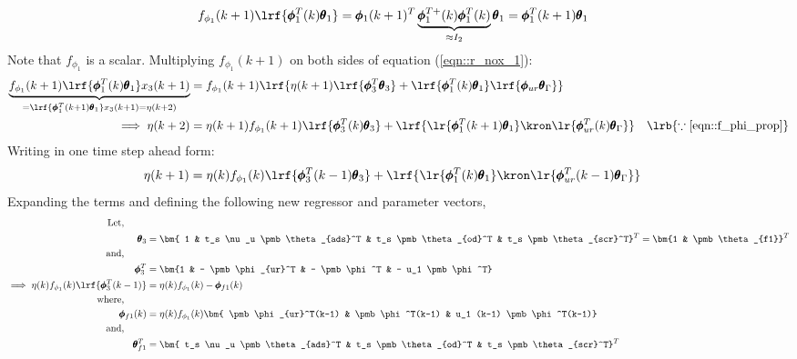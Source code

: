 \begin{align}
        f_{\phi_1}(k+1) \lrf{\pmb \phi_1^T(k) \pmb \theta_1} &= \pmb \phi_1(k+1)^T  \underbrace{\pmb \phi_1^{T+}(k) \pmb \phi_1^T(k)}_{\approx I_2} \pmb \theta_1
        = \pmb \phi_1^T(k+1) \pmb \theta_1
        \label{eqn::f_phi_prop}
\end{align}
Note that $f_{\phi_1}$ is a scalar. Multiplying $f_{\phi_1}(k+1)$ on both sides of equation (\ref{eqn::r_nox_1}):
\begin{align*}
      \underbrace{f_{\phi_1}(k+1) \lrf{\pmb \phi_1^T(k) \pmb \theta_1} x_3(k+1)}_{= \lrf{\pmb \phi_1^T(k+1) \pmb \theta_1} x_3(k+1)  = \eta (k+2)}
      &= f_{\phi_1}(k+1) \lrf{\eta(k+1) \lrf{\pmb \phi_3^T \pmb \theta_3} + \lrf{\pmb \phi_1^T(k) \pmb \theta_1} \lrf{\pmb \phi_{ur} \pmb \theta_\Gamma}} \\
      \implies \eta(k+2) &= \eta (k+1) f_{\phi_1}(k+1)\lrf{\pmb \phi_3^T (k) \pmb \theta_3}
                + \lrf{ \lr{\pmb \phi_1^T(k+1) \pmb \theta_1} \kron \lr{\pmb \phi^T_{ur}(k) \pmb \theta_\Gamma}}
        \quad \lrb{\because \ref{eqn::f_phi_prop}}
\end{align*}
Writing in one time step ahead form:
\begin{align}
        \eta (k+1) &=  \eta (k) f_{\phi_1}(k)\lrf{\pmb \phi_3^T (k-1) \pmb \theta_3}
                + \lrf{ \lr{\pmb \phi_1^T(k) \pmb \theta_1} \kron \lr{\pmb \phi^T_{ur}(k-1) \pmb \theta_\Gamma}}
        \label{eqn::r_nox_2}
\end{align}
Expanding the terms and defining the following new regressor and parameter vectors,
\begin{align*}
        \text{Let, } \qquad &\\
        \pmb \theta_3 &= \bm{ 1 &
                                t_s \nu_u \pmb \theta_{ads}^T &
                                t_s \pmb \theta_{od}^T        &
                                t_s \pmb \theta_{scr}^T} ^T
                        = \bm{1 & \pmb \theta_{f1}}^T\\
        \text{and, } \qquad &\\
        \pmb \phi_3^T &= \bm{1 &
                   - \pmb \phi_{ur}^T &
                   - \pmb \phi^T  &
                   - u_1 \pmb \phi^T}   \\
        \implies \eta (k) f_{\phi_1}(k)\lrf{\pmb \phi_3^T (k-1)} &= \eta(k) f_{\phi_1}(k) - \pmb \phi_{f1}(k)\\
        \text{where, } \qquad &\\
        \pmb \phi_{f1}(k)
                &= \eta(k) f_{\phi_1}(k)
                \bm{ \pmb \phi_{ur}^T(k-1) &
                    \pmb \phi^T(k-1)  &
                    u_1 (k-1) \pmb \phi^T(k-1)}   \\
        \text{and, } \qquad &\\
        \pmb \theta_{f1}^T &= \bm{ t_s \nu_u \pmb \theta_{ads}^T &
                                t_s \pmb \theta_{od}^T        &
                                t_s \pmb \theta_{scr}^T} ^T
\end{align*}
